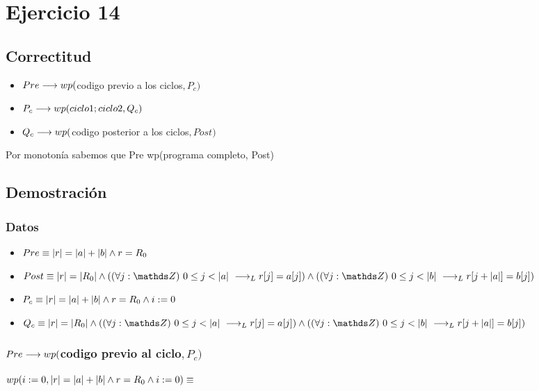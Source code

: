 \documentclass{article}
\begin{document}
\section*{Ejercicio 14}

\subsection*{Correctitud}
\begin{itemize}
    \item $Pre \longrightarrow wp($codigo previo a los ciclos$, P_{c})$
    \item $P_{c} \longrightarrow wp(ciclo1;ciclo2, Q_{c})$
    \item $Q_{c} \longrightarrow wp($codigo posterior a los ciclos$, Post)$
\end{itemize}

Por monotonía sabemos que Pre \implica wp(programa completo, Post)

\subsection*{Demostración}

\subsubsection*{Datos}
\begin{itemize}
    \item $Pre      \equiv |r| = |a| + |b| \wedge r = R_{0}$
    \item $Post     \equiv \longitud{r} = \longitud{R_{0}} \wedge (\paraTodo{j}{0}{\longitud{a}} \implicaLuego r[j] = a[j]) \wedge (\paraTodo{j}{0}{\longitud{b}} \implicaLuego r[j+\longitud{a}] = b[j])$
    \item $P_{c}    \equiv |r| = |a| + |b| \wedge r = R_{0} \wedge i:= 0$
    \item $Q_{c}    \equiv \longitud{r} = \longitud{R_{0}} \wedge (\paraTodo{j}{0}{\longitud{a}} \implicaLuego r[j] = a[j]) \wedge (\paraTodo{j}{0}{\longitud{b}} \implicaLuego r[j+\longitud{a}] = b[j])$
\end{itemize}

\subsubsection*{$Pre \longrightarrow wp($codigo previo al ciclo$, P_{c})$}

$wp(i:=0, |r| = |a| + |b| \wedge r = R_{0} \wedge i:= 0) \equiv$
\end{document}
